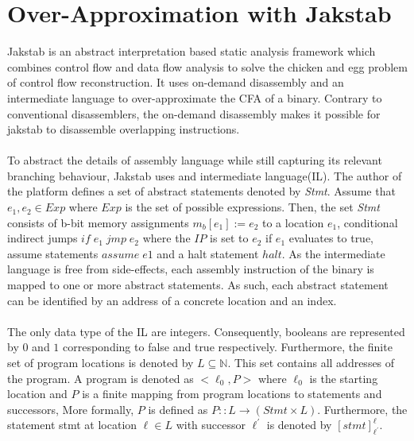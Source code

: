 \documentclass{kththesis}
\newcommand{\fbcomment}[1]{{#1}}
\renewcommand{\fbcomment}[1]{}
\renewcommand{\it}[1]{\textit{#1}}
\begin{document}
\section{Over-Approximation with Jakstab}
\fbcomment{\color{red}Goal: give the reader an overview of jakstab and enough understanding of the notation in the phd thesis of Jakstab(So that this can be used in later sections such for example as the section about CPA modifications). Also, introduce concepts such as tops and bottoms in the context of the Jakstab tool}
Jakstab\cite{Jakstab} is an abstract interpretation based static analysis framework which combines control flow and data flow analysis to solve the chicken and egg problem of control flow reconstruction. It uses on-demand disassembly and an intermediate language to over-approximate the CFA of a binary. Contrary to conventional disassemblers, the on-demand disassembly makes it possible for jakstab to disassemble overlapping instructions. 
\\ \\
To abstract the details of assembly language while still capturing its relevant branching behaviour, Jakstab uses and intermediate language(IL). The author of the platform defines a set of abstract statements denoted by \it{Stmt}. Assume that $e_1,e_2 \in Exp$ where $Exp$ is the set of possible expressions. Then, the set \it{Stmt} consists of b-bit memory assignments $m_b[e_1] := e_2$ to a location $e_1$, conditional indirect jumps $if\;e_1\;jmp\;e_2$ where the $IP$ is set to $e_2$ if $e_1$ evaluates to true, assume statements $assume\;e1$ and a halt statement $halt$. As the intermediate language is free from side-effects, each assembly instruction of the binary is mapped to one or more abstract statements. As such, each abstract statement can be identified by an address of a concrete location and an index. 
\\ \\
The only data type of the IL are integers. Consequently, booleans are represented by $0$ and $1$ corresponding to false and true respectively. Furthermore, the finite set of program locations is denoted by $L \subseteq \mathbb{N}$. This set contains all addresses of the program. A program is denoted as $<\ell_0,P>$ where $\ell_0$ is the starting location and $P$ is a finite mapping from program locations to statements and successors, More formally, $P$ is defined as $P:: L \rightarrow (Stmt \times L)$. Furthermore, the statement stmt at location $\ell \in L$ with successor $\ell^{'}$ is denoted by $[stmt]^{\ell}_{\ell^{'}}$. 
\\ \\
\end{document}
